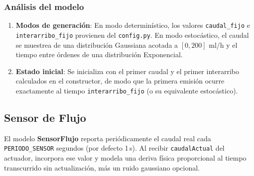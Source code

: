 \documentclass[12pt,a4paper]{article}
\begin{document}
\subsubsection*{Análisis del modelo}

\begin{enumerate}
    \item \textbf{Modos de generación}: En modo determinístico,
    los valores \texttt{caudal\_fijo} e \texttt{interarribo\_fijo}
    provienen del \texttt{config.py}.  En modo estocástico, el caudal
    se muestrea de una distribución Gaussiana acotada a $[0, 200]$
    ml/h y el tiempo entre órdenes de una distribución Exponencial.

    \item \textbf{Estado inicial}: Se inicializa con el primer caudal y
    el primer interarribo calculados en el constructor, de modo que la
    primera emisión ocurre exactamente al tiempo
    \texttt{interarribo\_fijo} (o su equivalente estocástico).
\end{enumerate}

\subsection{Sensor de Flujo}

El modelo \textbf{SensorFlujo} reporta periódicamente el caudal real
cada \texttt{PERIODO\_SENSOR} segundos (por defecto 1\,s).  Al recibir
\texttt{caudalActual} del actuador, incorpora ese valor y modela una
deriva física proporcional al tiempo transcurrido sin actualización,
más un ruido gaussiano opcional.
\end{document}
